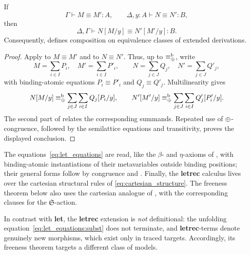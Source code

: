 \begin{proposition}
\label{prop:letrec_subst_respects_equiv}
If
\[
\Gamma\vdash M\equiv M':A,
\qquad
\Delta,y:A\vdash N\equiv N':B,
\]
then
\[
\Delta,\Gamma\vdash N[M/y]\equiv N'[M'/y]:B.
\]
Consequently,  defines composition on
equivalence classes of extended derivations.
\end{proposition}
\begin{proof}
Apply  to $M\equiv M'$ and to
$N\equiv N'$.  Thus, up to $\equiv_{\mathbin{\oplus}}^{\mathrm b}$, write
\[
M=\sum_{i\in I}P_i,\quad M'=\sum_{i\in I}P'_i,
\qquad
N=\sum_{j\in J}Q_j,\quad N'=\sum_{j\in J}Q'_j,
\]
with binding-atomic equations $P_i\equiv P'_i$ and
$Q_j\equiv Q'_j$.  Multilinearity gives
\[
N[M/y]\equiv_{\mathbin{\oplus}}^{\mathrm b}
  \sum_{j\in J}\sum_{i\in I}Q_j[P_i/y],
\qquad
N'[M'/y]\equiv_{\mathbin{\oplus}}^{\mathrm b}
  \sum_{j\in J}\sum_{i\in I}Q'_j[P'_i/y].
\]
The second part of  relates the
corresponding summands.  Repeated use of $\mathbin{\oplus}$-congruence, followed by the
semilattice equations and transitivity, proves the displayed conclusion.
\end{proof}

The equations~\eqref{eq:let_equations} are read, like the $\beta$- and
$\eta$-axioms of , with binding-atomic instantiations
of their metavariables outside binding positions; their general forms follow
by congruence and .  Finally, the
\textbf{letrec} calculus lives over the cartesian structural rules of
\autoref{eq:cartesian_structure}.  The freeness theorem below also uses the
cartesian analogue of , with the corresponding
clauses for the $\mathfrak S$-action.

In contrast with \textbf{let}, the \textbf{letrec} extension is \emph{not} definitional: the unfolding equation~\eqref{eq:let_equations:subst} does not terminate, and \textbf{letrec}-terms denote genuinely new morphisms, which exist only in traced targets.
Accordingly, its freeness theorem targets a different class of models.

